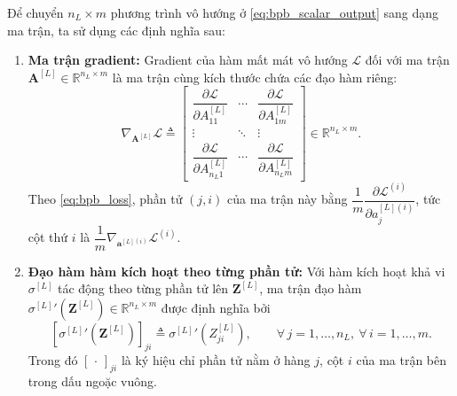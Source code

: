 Để chuyển $n_L \times m$ phương trình vô hướng ở \eqref{eq:bpb_scalar_output} sang dạng ma trận, ta sử dụng các định nghĩa sau:
\begin{enumerate}
    \item \textbf{Ma trận gradient:} Gradient của hàm mất mát vô hướng $\mathcal{L}$ đối với ma trận $\mathbf{A}^{[L]} \in \mathbb{R}^{n_L \times m}$ là ma trận cùng kích thước chứa các đạo hàm riêng:
    \begin{equation}
    \nabla_{\mathbf{A}^{[L]}}\mathcal{L} \triangleq
    \begin{bmatrix}
    \dfrac{\partial\mathcal{L}}{\partial A_{11}^{[L]}} & \cdots & \dfrac{\partial\mathcal{L}}{\partial A_{1m}^{[L]}} \\[8pt]
    \vdots & \ddots & \vdots \\[4pt]
    \dfrac{\partial\mathcal{L}}{\partial A_{n_L 1}^{[L]}} & \cdots & \dfrac{\partial\mathcal{L}}{\partial A_{n_L m}^{[L]}}
    \end{bmatrix} \in \mathbb{R}^{n_L \times m}.
    \end{equation}
    Theo \eqref{eq:bpb_loss}, phần tử $(j,i)$ của ma trận này bằng $\dfrac{1}{m}\dfrac{\partial\mathcal{L}^{(i)}}{\partial a_j^{[L](i)}}$, tức cột thứ $i$ là $\dfrac{1}{m}\nabla_{\mathbf{a}^{[L](i)}}\mathcal{L}^{(i)}$.
 
    \item \textbf{Đạo hàm hàm kích hoạt theo từng phần tử:} Với hàm kích hoạt khả vi $\sigma^{[L]}$ tác động theo từng phần tử lên $\mathbf{Z}^{[L]}$, ma trận đạo hàm ${\sigma^{[L]}}'\!\left(\mathbf{Z}^{[L]}\right) \in \mathbb{R}^{n_L \times m}$ được định nghĩa bởi
    \begin{equation}
    \left[{\sigma^{[L]}}'\!\left(\mathbf{Z}^{[L]}\right)\right]_{ji} \triangleq {\sigma^{[L]}}'\!\left(Z_{ji}^{[L]}\right), \qquad \forall\, j = 1,\dots,n_L,\ \forall\, i = 1,\dots,m.
    \end{equation}
    Trong đó $[\,\cdot\,]_{ji}$ là ký hiệu chỉ phần tử nằm ở hàng $j$, cột $i$ của ma trận bên trong dấu ngoặc vuông.
 

\end{enumerate}
